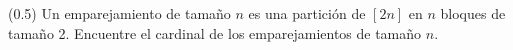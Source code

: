 (0.5) Un emparejamiento de tamaño $n$ es una partición de $[2n]$ en $n$ bloques de tamaño 2. Encuentre el cardinal de los emparejamientos de tamaño $n$.
